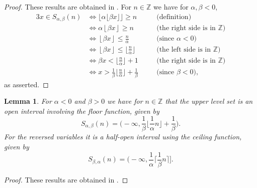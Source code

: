 \documentclass[12pt,letterpaper, reqno]{amsart}
\newtheorem{lem}[thm]{Lemma}
\theoremstyle{definition}
\theoremstyle{remark}
\newtheorem{rmk}[thm]{Remark}
\newcommand{\ZZ}{\ensuremath{\mathbb{Z}}}
\newcommand{\floor}[1]{\lfloor{#1}\rfloor}
\newcommand{\ceil}[1]{\lceil{#1}\rceil}
\begin{document}
 \begin{proof}
These results are obtained in \cite[Lemma 4]{LMR16}.
For $n \in \ZZ$ we have for $\alpha, \beta <0$, 
\begin{alignat*}{3}
    x \in S_{\alpha, \beta} (n) & \Leftrightarrow \floor{ \alpha \floor{ \beta x }} \ge n &\quad& \text{(definition)}\\
    &\Leftrightarrow{} \alpha \left\lfloor \beta x\right\rfloor \ge n &\quad& \text{(the right side is in $\ZZ$)}\\
    &\Leftrightarrow{} \left\lfloor \beta x \right\rfloor \le \frac{n}{\alpha} &\quad& \text{(since $\alpha < 0$)}\\
    &\Leftrightarrow{} \left\lfloor \beta x \right\rfloor \le \lfloor \frac{n}{\alpha} \rfloor &\quad& \text{(the left side is in $\ZZ$)} \\
    &\Leftrightarrow{} \beta x < \lfloor \frac{n}{\alpha} \rfloor + 1 &\quad& \text{(the right side is in $\ZZ$)}\\
    &\Leftrightarrow{} x > \frac{1}{\beta} \lfloor \frac{n}{\alpha}  \rfloor + \frac{1}{\beta} &\quad& \text{(since $\beta< 0$)},
  \end{alignat*}
   as asserted.
\end{proof}
\begin{lem}\label{lem:23}
For $\alpha<0$ and $ \beta >0$ we have for $n \in \ZZ$  that
the upper level set is an open interval involving the floor function, given by
\[ S_{\alpha,\beta}(n)  = \bigg(-\infty, \frac{1}{\beta}\floor{\frac{1}{\alpha}n}  +\frac{1}{\beta} \bigg).
\]
For the reversed variables  it is a half-open interval using the ceiling function, given by
\[
 S_{\beta,\alpha}(n) = \bigg(-\infty, \frac1\alpha \ceil{\frac{1}{\beta} n}\bigg].
 \]
\end{lem}

\begin{proof}
These results are obtained in \cite[Lemma 7]{LMR16}.
\end{proof}





%
%
\end{document}
